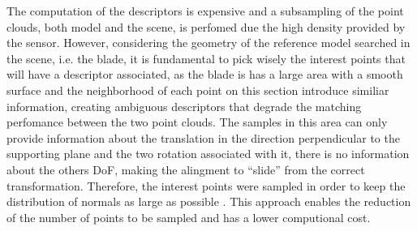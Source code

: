 The computation of the descriptors is expensive and a subsampling of the point
clouds, both model and the scene, is perfomed due the high density provided by
the sensor. However, considering the geometry of the reference model searched
in the scene, i.e. the blade, it is fundamental to pick wisely the interest
points that will have a descriptor associated, as the blade is has a large area
with a smooth surface and the neighborhood of each point on this section
introduce similiar information, creating ambiguous descriptors that degrade the
matching perfomance between the two point clouds.
The samples in this area can only provide information about the translation in
the direction perpendicular to the supporting plane and the two rotation
associated with it, there is no information about the others DoF, making the
alingment to ``slide'' from the correct transformation. Therefore, the interest
points were sampled in order to keep the distribution of normals as large as
possible \cite{Rusinkiewicz2001}. This approach enables the reduction of the
number of points to be sampled and has a lower computional cost.



